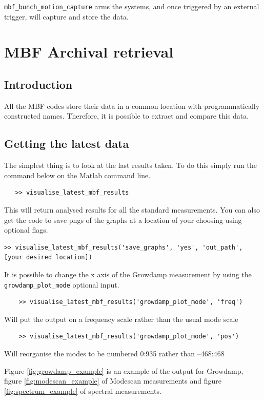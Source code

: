 \documentclass{report}
\begin{document}
 \verb|mbf_bunch_motion_capture| arms the systems, and once triggered by an external trigger, will capture and store the data.

\chapter{MBF Archival retrieval}

\section{Introduction}

All the MBF codes store their data in a common location with programmatically constructed names. Therefore, it is possible to extract and compare this data. 

\section{Getting the latest data} 

The simplest thing is to look at the last results taken. To do this simply run the command below on the Matlab command line. 
\begin{verbatim}
   >> visualise_latest_mbf_results 
\end{verbatim}
 This will return analysed results for all the standard measurements.
 You can also get the code to save pngs of the graphs at a location of your choosing using optional flags.
\begin{verbatim}
>> visualise_latest_mbf_results('save_graphs', 'yes', 'out_path', [your desired location])
\end{verbatim}
It is possible to change the x axis of the Growdamp measurement by using the  \verb+growdamp_plot_mode+ optional input.
\begin{verbatim}
    >> visualise_latest_mbf_results('growdamp_plot_mode', 'freq') 
\end{verbatim}
Will put the output on a frequency scale rather than the usual mode scale 
\begin{verbatim}
    >> visualise_latest_mbf_results('growdamp_plot_mode', 'pos') 
\end{verbatim}
Will reorganise the modes to be numbered 0:935 rather than –468:468 

Figure \ref{fig:growdamp_example} is an example of the output for Growdamp, figure \ref{fig:modescan_example} of Modescan measurements and figure \ref{fig:spectrum_example} of spectral measurements.
\end{document}
